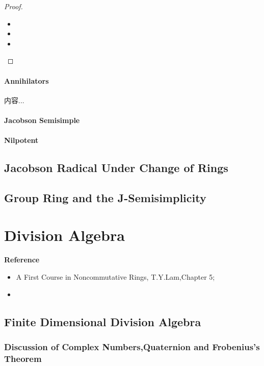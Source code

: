 \documentclass[Total.tex]{subfiles}
\begin{document}
	\begin{proof}
		\begin{itemize}
			\item 
			\item 
			\item 
		\end{itemize}
	\end{proof}
	
	\subsubsection{Annihilators}
	
	\begin{Def}
		内容...
	\end{Def}
	\subsubsection{Jacobson Semisimple}
	\subsubsection{Nilpotent}
	
	\section{Jacobson Radical Under Change of Rings}
	
	\section{Group Ring and the J-Semisimplicity}
	
	\chapter{Division Algebra}
	
	\textbf{Reference}
	
	\begin{itemize}
		\item A First Course in Noncommutative Rings, T.Y.Lam,Chapter 5;
		\item 
	\end{itemize}
	
	\section{Finite Dimensional Division Algebra}
	
	\subsection{Discussion of Complex Numbers,Quaternion and Frobenius's Theorem}
	
\end{document}
